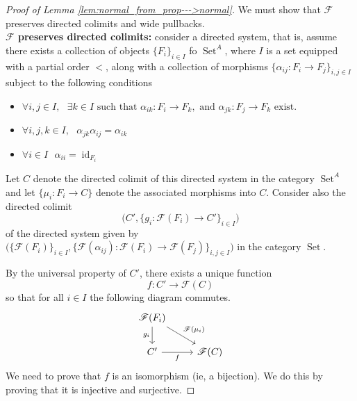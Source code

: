 \documentclass[12pt]{article}
\theoremstyle{plain}
\theoremstyle{definition}
\newcommand{\scr}[1]{\mathscr{#1}}
\newcommand{\lto}{\longrightarrow}
\DeclareMathOperator{\set}{Set}
\begin{document}
\begin{proof}[Proof of Lemma \ref{lem:normal_from_prop--->normal}]
		We must show that $\scr{F}$ preserves directed colimits and wide pullbacks.\\
		\textbf{$\scr{F}$ preserves directed colimits:} consider a directed system, that is, assume there exists a collection of objects $\lbrace F_i \rbrace_{i \in I}$ fo $\set^A$, where $I$ is a set equipped with a partial order $<$, along with a collection of morphisms $\lbrace \alpha_{ij}: F_i \lto F_j \rbrace_{i,j \in I}$ subject to the following conditions
		\begin{itemize}
			\item $\forall i, j \in I,\text{ }\exists k \in I\text{ such that }\alpha_{ik}: F_i \lto F_k, \text{ and } \alpha_{jk}: F_j \lto F_k\text{ exist.}$
			\item $\forall i,j,k \in I,\text{ }\alpha_{jk} \alpha_{ij} = \alpha_{ik}$
			\item $\forall i \in I\text{ }\alpha_{ii} = \operatorname{id}_{F_i}$
			\end{itemize}
		Let $C$ denote the directed colimit of this directed system in the category $\set^A$ and let $\{\mu_i: F_i \lto C\}$ denote the associated morphisms into $C$. Consider also the directed colimit
		\begin{equation}
			\big(C',\{g_i: \scr{F}(F_i) \lto C'\}_{i \in I}\big)
		\end{equation}
		of the directed system given by $\big(\lbrace \scr{F}( F_i) \rbrace_{i \in I}, \lbrace \scr{F}(\alpha_{ij}): \scr{F}(F_i) \lto \scr{F}(F_j)\rbrace_{i,j \in I}\big)$ in the category $\set$.
		
		By the universal property of $C'$, there exists a unique function
		\begin{equation}
			f: C' \lto \scr{F}(C)
			\end{equation}
		so that for all $i \in I$ the following diagram commutes.
		\begin{equation}
			\begin{tikzcd}
				\scr{F}(F_i)\arrow[d,swap,"{g_i}"]\arrow[dr,"{\scr{F}(\mu_i)}"]\\
				C'\arrow[r,swap,"{f}"] & \scr{F} (C)
				\end{tikzcd}
			\end{equation}
		We need to prove that $f$ is an isomorphism (ie, a bijection). We do this by proving that it is injective and surjective.
		

\end{proof}
\end{document}
